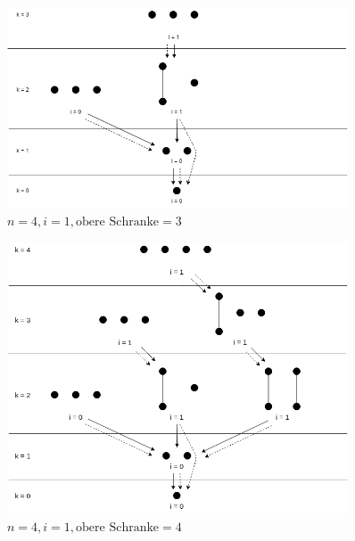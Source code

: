 \begin{frame}{\insertsection}

  \begin{figure}[!b]
    \centering
    \includegraphics[width=0.9\textwidth,height=0.67\textheight,keepaspectratio]{./figures/backward-searchtree-bound3.png}
    \caption{$n=4,i=1,\text{obere Schranke}=3$}
    \label{fig:backward-searchtree-bound3}
  \end{figure}
\end{frame}

\begin{frame}{\insertsection}
  \begin{figure}[!b]
    \centering
    \includegraphics[width=0.9\textwidth,height=0.67\textheight,keepaspectratio]{./figures/backward-searchtree-bound4.png}
    \caption{$n=4,i=1,\text{obere Schranke}=4$}
    \label{fig:backward-searchtree-bound4}
  \end{figure}

\end{frame}

